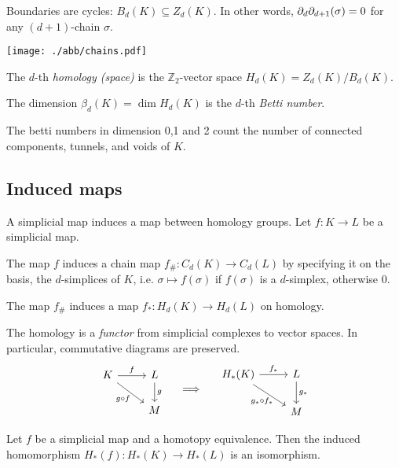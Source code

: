 \begin{multicols*}{3}
\begin{rem}
Boundaries are cycles: $B_d(K)\subseteq Z_d(K)$. In other words, $\partial_d\partial_{d+1}(\sigma)=0$ for any $(d+1)$-chain $\sigma$.
\begin{center}\vspace{-0.53pc}
\texttt{[image: ./abb/chains.pdf]} \vspace{-0.34pc}
\end{center}
 \end{rem}
\rspace
\begin{defi}[Homology]
The $d$-th \emph{homology (space)} is the $\mathbb{Z}_2$-vector space
$H_d(K) = Z_d(K) / B_d(K).$
\end{defi}
\rspace
\begin{defi}
The dimension $\beta_d(K)= \dim H_d(K)$ is the $d$-th \emph{Betti number}.
\end{defi}
\rspace
\begin{rem}
The betti numbers in dimension 0,1 and 2 count the number of connected components, tunnels, and voids of $K$.
\end{rem}
\rspace
\drawaline \vspace{-0.5pc}
\subsection{Induced maps}
{\myfont A simplicial map induces a map between homology groups.} Let $f:K\to L$ be a simplicial map.\vspace{-0.5pc}
\begin{defi}
The map $f$ induces a chain map $f_\#:C_d(K)\to C_d(L)$ by specifying it on the basis, the $d$-simplices of $K$, i.e. $\sigma \mapsto f(\sigma)$ if $f(\sigma)$ is a $d$-simplex, otherwise $0$.
\end{defi}
\rspace
\begin{lemma}
The map $f_\#$ induces a map $f_*:H_d(K)\to H_d(L)$ on homology.
\end{lemma}
\rspace
\begin{rem}
The homology is a \emph{functor} from simplicial complexes to vector spaces. In particular, commutative diagrams are preserved. \vspace{-0.4pc}
\begin{equation*}
	\begin{tikzcd}
	K \arrow{r}{f} \arrow{rd}[below]{g\circ f\ \ \ \ } & L \arrow{d}[right]{g}\\
					 & M
	\end{tikzcd}
	\quad   \implies \quad 
		\begin{tikzcd}
	H_*(K) \arrow{r}{f_*} \arrow{rd}[below]{g_*\circ f_*\ \ \ \ } & L \arrow{d}[right]{g_*}\\
					 & M
	\end{tikzcd}
	\end{equation*}
\end{rem}
\rspace
\begin{theorem}
Let $f$ be a simplicial map and a homotopy equivalence. Then the induced homomorphism $H_*(f):H_*(K)\to H_*(L)$ is an isomorphism.
\end{theorem}
\rspace
\drawaline \vspace{-0.5pc}

\end{multicols*}
